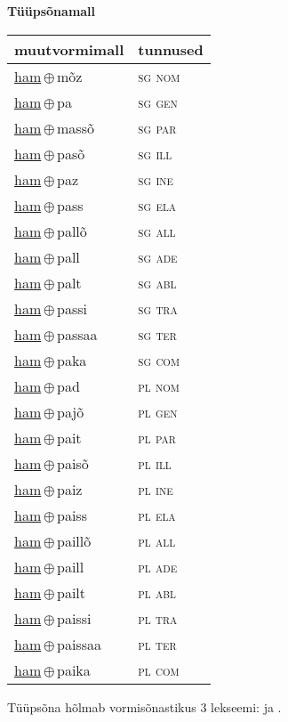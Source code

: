 

\vspace{3.5em}
\noindent \begin{minipage}{\textwidth}
\noindent \textbf{Tüüpsõnamall \,}\\

\begin{sideways}
\begin{tabular}{l l}
muutvormimall & tunnused \\
\hline
\underline{ham}\,$\oplus$\,mõz & \textsc{ sg nom } \\
\underline{ham}\,$\oplus$\,pa & \textsc{ sg gen } \\
\underline{ham}\,$\oplus$\,massõ & \textsc{ sg par } \\
\underline{ham}\,$\oplus$\,pasõ & \textsc{ sg ill } \\
\underline{ham}\,$\oplus$\,paz & \textsc{ sg ine } \\
\underline{ham}\,$\oplus$\,pass & \textsc{ sg ela } \\
\underline{ham}\,$\oplus$\,pallõ & \textsc{ sg all } \\
\underline{ham}\,$\oplus$\,pall & \textsc{ sg ade } \\
\underline{ham}\,$\oplus$\,palt & \textsc{ sg abl } \\
\underline{ham}\,$\oplus$\,passi & \textsc{ sg tra } \\
\underline{ham}\,$\oplus$\,passaa & \textsc{ sg ter } \\
\underline{ham}\,$\oplus$\,paka & \textsc{ sg com } \\
\underline{ham}\,$\oplus$\,pad & \textsc{ pl nom } \\
\underline{ham}\,$\oplus$\,pajõ & \textsc{ pl gen } \\
\underline{ham}\,$\oplus$\,pait & \textsc{ pl par } \\
\underline{ham}\,$\oplus$\,paisõ & \textsc{ pl ill } \\
\underline{ham}\,$\oplus$\,paiz & \textsc{ pl ine } \\
\underline{ham}\,$\oplus$\,paiss & \textsc{ pl ela } \\
\underline{ham}\,$\oplus$\,paillõ & \textsc{ pl all } \\
\underline{ham}\,$\oplus$\,paill & \textsc{ pl ade } \\
\underline{ham}\,$\oplus$\,pailt & \textsc{ pl abl } \\
\underline{ham}\,$\oplus$\,paissi & \textsc{ pl tra } \\
\underline{ham}\,$\oplus$\,paissaa & \textsc{ pl ter } \\
\underline{ham}\,$\oplus$\,paika & \textsc{ pl com } \\
\end{tabular}
\end{sideways}
\label{tab:tüüpsõnamall-hammõz}

\end{minipage}

 
\vspace{1em}
\noindent Tüüpsõna hõlmab vormisõnastikus 3 lekseemi:  ja .
